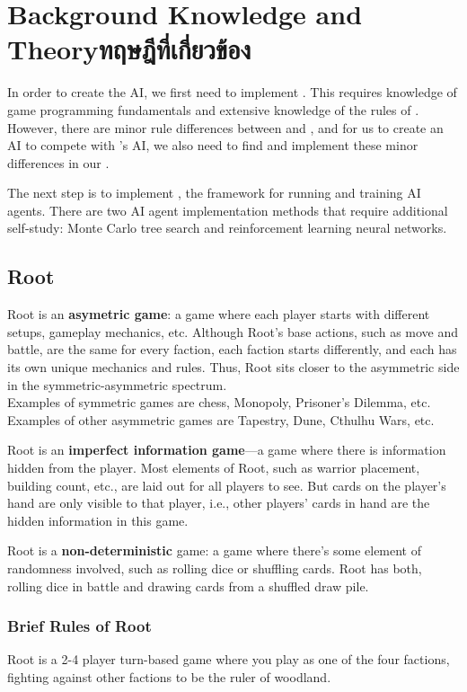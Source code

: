 \chapter{\ifenglish Background Knowledge and Theory\else ทฤษฎีที่เกี่ยวข้อง\fi}

In order to create the AI, we first need to implement \RootOurs{}. This requires knowledge of game programming fundamentals and extensive knowledge of the rules of \RootB{}. However, there are minor rule differences between \RootV{} and \RootB{}, and for us to create an AI to compete with \RootV{}’s AI, we also need to find and implement these minor differences in our \RootOurs{}.

The next step is to implement \RootAI{}, the framework for running \RootOurs{} and training AI agents. There are two AI agent implementation methods that require additional self-study: Monte Carlo tree search and reinforcement learning neural networks.

\section{Root}
Root is an \textbf{asymetric game}: a game where each player starts with different setups, gameplay mechanics, etc. Although Root’s base actions, such as move and battle, are the same for every faction, each faction starts differently, and each has its own unique mechanics and rules. Thus, Root sits closer to the asymmetric side in the symmetric-asymmetric spectrum. \\
Examples of symmetric games are chess, Monopoly, Prisoner's Dilemma, etc.\\
Examples of other asymmetric games are Tapestry, Dune, Cthulhu Wars, etc.

Root is an \textbf{imperfect information game}—a game where there is information hidden from the player. Most elements of Root, such as warrior placement, building count, etc., are laid out for all players to see. But cards on the player’s hand are only visible to that player, i.e., other players’ cards in hand are the hidden information in this game.

Root is a \textbf{non-deterministic} game: a game where there’s some element of randomness involved, such as rolling dice or shuffling cards. Root has both, rolling dice in battle and drawing cards from a shuffled draw pile.

\subsection{Brief Rules of Root} \label{brief-rules-of-root}
Root is a 2-4 player turn-based game where you play as one of the four factions, fighting against other factions to be the ruler of woodland.

